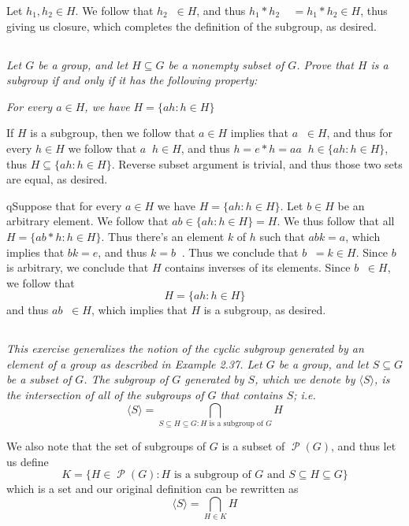 \documentclass[11pt,oneside,titlepage]{book}
\DeclareMathOperator \pow {\mathcal {P}}
\DeclareMathOperator \inv {^{-1}}
\newcommand{\eangle}[1]{\langle #1 \rangle}
\newcommand{\set}[1]{\{ #1 \}}
\begin{document}
Let $h_1, h_2 \in H$. We follow that $h_2 \inv \in H$, and thus
$h_1 * h_2 \inv \inv = h_1 * h_2 \in H$, thus giving us closure,
which completes the definition of the subgroup, as desired.

\subsection{}

\textit{Let $G$ be a group, and let $H \subseteq G$ be a nonempty subset of $G$. Prove that
  $H$ is a subgroup if and only if it has the following property:}

\textit{For every $a \in H$, we have $H = \set{ah: h \in H}$}

If $H$ is a subgroup, then we follow that $a \in H$ implies that
$a\inv \in H$, and thus for every $h \in H$ we follow that $a \inv h
\in H$, and thus $h = e * h = a a\inv h \in \set{ah: h \in H}$, thus
$H \subseteq \set{ah: h \in H}$. Reverse subset argument is trivial, and thus
those two sets are equal, as desired.

qSuppose that for every $a \in H$ we have $H = \set{ah: h \in H}$.
Let $b \in H$ be an arbitrary element. We follow that $a b \in
\set{ah: h \in H} = H$.  We thus follow that all $H = \set{ab * h: h
\in H}$. Thus there's an element $k$ of $h$ such that $abk = a$, which
implies that $bk = e$, and thus $k = b\inv$. Thus we conclude that
$b\inv = k \in H$. Since $b$ is arbitrary, we conclude that $H$
contains inverses of its elements. Since $b\inv \in H$, we follow that
$$H = \set{a h: h \in H}$$
and thus $a b\inv \in H$, which implies that $H$ is a subgroup, as desired.

\subsection{}

\textit{This exercise generalizes the notion of the cyclic subgroup
  generated by an element of a group as described in Example 2.37.
  Let $G$ be a group, and let $S \subseteq G$ be a subset of $G$. The
  subgroup of $G$ generated by $S$, which we denote by $\eangle{S}$,
  is the intersection of all of the subgroups of $G$ that contains $S$;
  i.e.
  $$\eangle{S} = \bigcap_{S \subseteq H \subseteq G: H\text{ is a subgroup of }G} H$$
}

We also note that the set of subgroups of $G$ is a subset of $\pow(G)$,
and thus let us define
$$K = \set{H \in \pow(G): H\text{ is a subgroup of }G \text{ and }S \subseteq H \subseteq G}$$
which is a set and our original definition can be rewritten as
$$\eangle{S} = \bigcap_{H \in K}{H}$$
\end{document}
